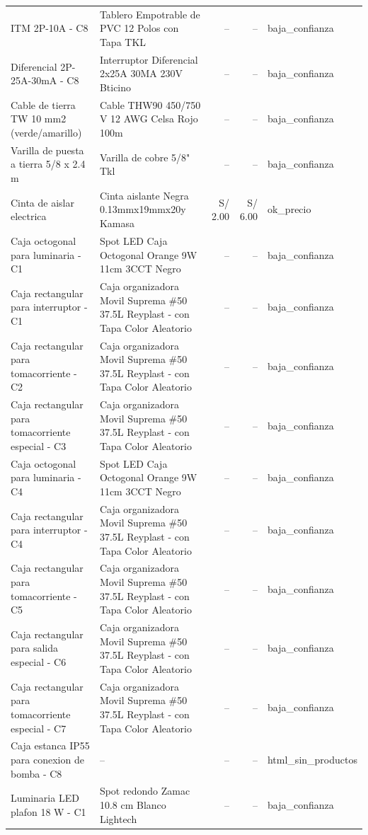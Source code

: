\documentclass[11pt,a4paper]{article}
\begin{document}
\begin{longtable}{p{} p{} r r p{}}
ITM 2P-10A - C8 & Tablero Empotrable de PVC 12 Polos con Tapa TKL & -- & -- & baja\_confianza \\
Diferencial 2P-25A-30mA - C8 & Interruptor Diferencial 2x25A 30MA 230V Bticino & -- & -- & baja\_confianza \\
Cable de tierra TW 10 mm2 (verde/amarillo) & Cable THW90 450/750 V 12 AWG Celsa Rojo 100m & -- & -- & baja\_confianza \\
Varilla de puesta a tierra 5/8 x 2.4 m & Varilla de cobre 5/8" Tkl & -- & -- & baja\_confianza \\
Cinta de aislar electrica & Cinta aislante Negra 0.13mmx19mmx20y Kamasa & S/ 2.00 & S/ 6.00 & ok\_precio \\
Caja octogonal para luminaria - C1 & Spot LED Caja Octogonal Orange 9W 11cm 3CCT Negro & -- & -- & baja\_confianza \\
Caja rectangular para interruptor - C1 & Caja organizadora Movil Suprema \#50 37.5L Reyplast - con Tapa Color Aleatorio & -- & -- & baja\_confianza \\
Caja rectangular para tomacorriente - C2 & Caja organizadora Movil Suprema \#50 37.5L Reyplast - con Tapa Color Aleatorio & -- & -- & baja\_confianza \\
Caja rectangular para tomacorriente especial - C3 & Caja organizadora Movil Suprema \#50 37.5L Reyplast - con Tapa Color Aleatorio & -- & -- & baja\_confianza \\
Caja octogonal para luminaria - C4 & Spot LED Caja Octogonal Orange 9W 11cm 3CCT Negro & -- & -- & baja\_confianza \\
Caja rectangular para interruptor - C4 & Caja organizadora Movil Suprema \#50 37.5L Reyplast - con Tapa Color Aleatorio & -- & -- & baja\_confianza \\
Caja rectangular para tomacorriente - C5 & Caja organizadora Movil Suprema \#50 37.5L Reyplast - con Tapa Color Aleatorio & -- & -- & baja\_confianza \\
Caja rectangular para salida especial - C6 & Caja organizadora Movil Suprema \#50 37.5L Reyplast - con Tapa Color Aleatorio & -- & -- & baja\_confianza \\
Caja rectangular para tomacorriente especial - C7 & Caja organizadora Movil Suprema \#50 37.5L Reyplast - con Tapa Color Aleatorio & -- & -- & baja\_confianza \\
Caja estanca IP55 para conexion de bomba - C8 & -- & -- & -- & html\_sin\_productos \\
Luminaria LED plafon 18 W - C1 & Spot redondo Zamac 10.8 cm Blanco Lightech & -- & -- & baja\_confianza \\

\end{longtable}
\end{document}
